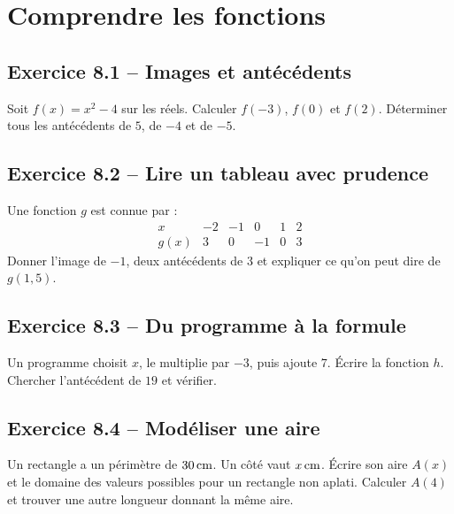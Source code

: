 \chapter{Comprendre les fonctions}
\label{exercices:08}
\section*{Exercice 8.1 -- Images et antécédents}
Soit $f(x)=x^2-4$ sur les réels. Calculer $f(-3)$, $f(0)$ et $f(2)$. Déterminer tous les antécédents de $5$, de $-4$ et de $-5$.

\section*{Exercice 8.2 -- Lire un tableau avec prudence}
Une fonction $g$ est connue par :
\[
\begin{array}{c|rrrrr}x&-2&-1&0&1&2\\\hline g(x)&3&0&-1&0&3\end{array}
\]
Donner l'image de $-1$, deux antécédents de $3$ et expliquer ce qu'on peut dire de $g(1{,}5)$.

\section*{Exercice 8.3 -- Du programme à la formule}
Un programme choisit $x$, le multiplie par $-3$, puis ajoute $7$. Écrire la fonction $h$. Chercher l'antécédent de $19$ et vérifier.

\section*{Exercice 8.4 -- Modéliser une aire}
Un rectangle a un périmètre de $30\,\mathrm{cm}$. Un côté vaut $x\,\mathrm{cm}$. Écrire son aire $A(x)$ et le domaine des valeurs possibles pour un rectangle non aplati. Calculer $A(4)$ et trouver une autre longueur donnant la même aire.
